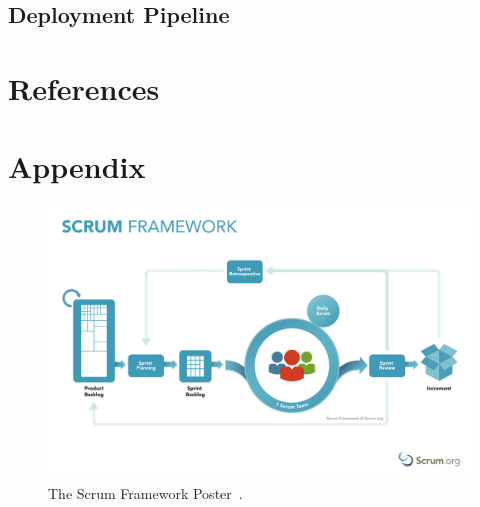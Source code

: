 \documentclass[12pt,a4paper]{article}
\theoremstyle{definition}
\begin{document}
    \subsection{Deployment Pipeline}


\newpage

\section{References}

\begin{flushleft}
    
\end{flushleft}

\newpage

\section{Appendix}

    \begin{figure}[H]
        \centering
        \includegraphics[scale=0.4]{img/ScrumFramework.pdf}
        \caption{The Scrum Framework Poster~\cite{ScrumOrgPoster}.}
        \label{fig:ScrumOrgPoster}
    \end{figure}
\end{document}
